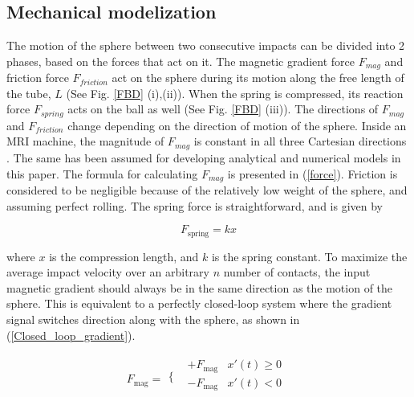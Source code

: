 \documentclass[letterpaper, 10 pt, conference]{ieeeconf}  %
\begin{document}
\subsection{Mechanical modelization}
The motion of the sphere between two consecutive impacts can be divided into 2  phases, based on the forces that act on it. The magnetic gradient force $F_{mag}$ and friction force $F_{friction}$ act on the sphere during its motion along the free length of the tube, $L$ (See Fig. \ref{FBD} (i),(ii)). When the spring is compressed, its reaction force $F_{spring}$ acts on the ball as well (See Fig. \ref{FBD} (iii)). The directions of $F_{mag}$ and $F_{friction}$  change depending on the direction of motion of the sphere. Inside an MRI machine, the magnitude of $F_{mag}$ is constant in all three Cartesian directions \cite{CMR:CMR20163}. The same has been assumed for developing analytical and numerical models in this paper. The formula for calculating $F_{mag}$ is presented in  (\ref{force}). Friction is considered to be negligible because of the relatively low weight of the sphere, and assuming perfect rolling. The spring force is straightforward, and is given by

\begin{equation}
F_{\text{spring}}=k x
\label{spring_force}
\end{equation}

where $x$ is the compression length, and $k$ is the spring constant. To maximize the average impact velocity over an arbitrary $n$ number of contacts, the input magnetic gradient should always be in the same direction as the motion of the sphere. This is equivalent to a perfectly closed-loop system where the gradient signal switches direction along with the sphere, as shown in (\ref{Closed_loop_gradient}).

\begin{equation}
F_{\text{mag}}=
\begin{array}{cc}
\{ & 
\begin{array}{cc}
+F_{\text{mag}} & x' (t)\geq 0 \\
-F_{\text{mag}} & x' (t)<0 \\
\end{array}
\\
\end{array}
\label{Closed_loop_gradient}
\end{equation}
\end{document}
